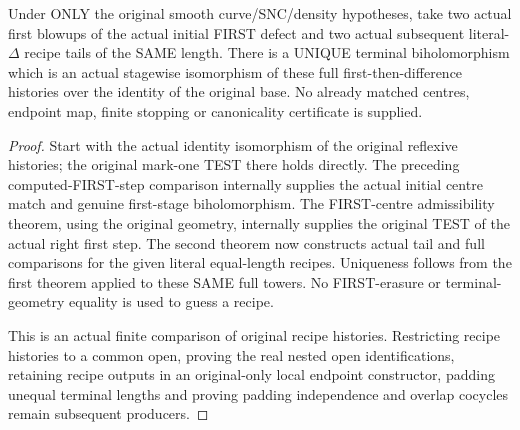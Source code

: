 \begin{theorem}
\label{hir:sharp-original-curve-equal-length-two-phase-recipe-comparison}
\leanok
Under ONLY the original smooth curve/SNC/density hypotheses, take two
actual first blowups of the actual initial FIRST defect and two actual
subsequent literal-$\Delta$ recipe tails of the SAME length. There is a
UNIQUE terminal biholomorphism which is an actual stagewise
isomorphism of these full first-then-difference histories over the
identity of the original base. No already matched centres, endpoint
map, finite stopping or canonicality certificate is supplied.
\end{theorem}
\begin{proof}
Start with the actual identity isomorphism of the original reflexive
histories; the original mark-one TEST there holds directly. The
preceding computed-FIRST-step comparison internally supplies the
actual initial centre match and genuine first-stage biholomorphism.
The FIRST-centre admissibility theorem, using the original geometry,
internally supplies the original TEST of the actual right first step.
The second theorem now constructs actual tail and full comparisons
for the given literal equal-length recipes. Uniqueness follows from
the first theorem applied to these SAME full towers. No FIRST-erasure
or terminal-geometry equality is used to guess a recipe.

This is an actual finite comparison of original recipe histories.
Restricting recipe histories to a common open, proving the real nested
open identifications, retaining recipe outputs in an original-only
local endpoint constructor, padding unequal terminal lengths and proving
padding independence and overlap cocycles remain subsequent producers.
\end{proof}
